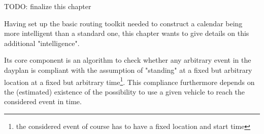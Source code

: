 TODO: finalize this chapter\newline

Having set up the basic routing toolkit needed to construct a calendar being more intelligent than a standard one, this chapter wants to give details on this additional "intelligence".\newline

Its core component is an algorithm to check whether any arbitrary event in the dayplan is compliant with the assumption of "standing" at a fixed but arbitrary location at a fixed but arbitrary time\footnote{the considered event of course has to have a fixed location and start time}. This compliance furthermore depends on the (estimated) existence of the possibility to use a given vehicle to reach the considered event in time.\newline

